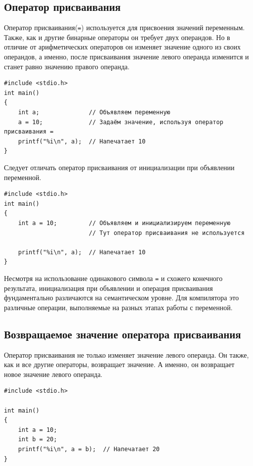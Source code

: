 \documentclass[10pt]{article}
\begin{document}
\subsection*{Оператор присваивания}
Оператор присваивания(\texttt{=}) используется для присвоения значений переменным. Также, как и другие бинарные операторы он требует двух операндов. Но в отличие от арифметических операторов он изменяет значение одного из своих операндов, а именно, после присваивания значение левого операнда изменится и станет равно значению правого операнда.
\begin{lstlisting}
#include <stdio.h>
int main()
{
	int a;				// Объявляем переменную
	a = 10;             // Задаём значение, используя оператор присваивания =
	printf("%i\n", a);  // Напечатает 10
}
\end{lstlisting}

\noindent Следует отличать оператор присваивания от инициализации при объявлении переменной. 
\begin{lstlisting}
#include <stdio.h>
int main()
{
	int a = 10;			// Объявляем и инициализируем переменную
		    			// Тут оператор присваивания не используется
	
	printf("%i\n", a);  // Напечатает 10
}
\end{lstlisting}
Несмотря на использование одинакового символа \texttt{=} и схожего конечного результата, инициализация при объявлении и операция присваивания фундаментально различаются на семантическом уровне. Для компилятора это различные операции, выполняемые на разных этапах работы с переменной.

\subsection*{Возвращаемое значение оператора присваивания}
Оператор присваивания не только изменяет значение левого операнда. Он также, как и все другие операторы, возвращает значение. А именно, он возвращает новое значение левого операнда.
\begin{lstlisting}
#include <stdio.h>

int main()
{
    int a = 10;
    int b = 20;
    printf("%i\n", a = b);  // Напечатает 20
}
\end{lstlisting}
\end{document}
